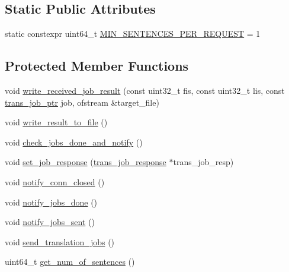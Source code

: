 \subsection*{Static Public Attributes}
\begin{DoxyCompactItemize}
\item 
static constexpr uint64\+\_\+t \hyperlink{classuva_1_1smt_1_1bpbd_1_1client_1_1trans__manager_a805717fdbf4e89f34206499160d8155b}{M\+I\+N\+\_\+\+S\+E\+N\+T\+E\+N\+C\+E\+S\+\_\+\+P\+E\+R\+\_\+\+R\+E\+Q\+U\+E\+S\+T} = 1
\end{DoxyCompactItemize}
\subsection*{Protected Member Functions}
\begin{DoxyCompactItemize}
\item 
void \hyperlink{classuva_1_1smt_1_1bpbd_1_1client_1_1trans__manager_a89447f8d607a208280bab7d175ee31f4}{write\+\_\+received\+\_\+job\+\_\+result} (const uint32\+\_\+t fis, const uint32\+\_\+t lis, const \hyperlink{namespaceuva_1_1smt_1_1bpbd_1_1client_a9de0122a1e3e5b28765f0b7b06449aa5}{trans\+\_\+job\+\_\+ptr} job, ofstream \&target\+\_\+file)
\item 
void \hyperlink{classuva_1_1smt_1_1bpbd_1_1client_1_1trans__manager_a78c14976fac089d29a423e597a4af98f}{write\+\_\+result\+\_\+to\+\_\+file} ()
\item 
void \hyperlink{classuva_1_1smt_1_1bpbd_1_1client_1_1trans__manager_ad36b90b1a5f36a6a4ae92460aa242f2a}{check\+\_\+jobs\+\_\+done\+\_\+and\+\_\+notify} ()
\item 
void \hyperlink{classuva_1_1smt_1_1bpbd_1_1client_1_1trans__manager_acd73d0878dc3727ea3af05a58ff0eeb9}{set\+\_\+job\+\_\+response} (\hyperlink{classuva_1_1smt_1_1bpbd_1_1common_1_1messaging_1_1trans__job__response}{trans\+\_\+job\+\_\+response} $\ast$trans\+\_\+job\+\_\+resp)
\item 
void \hyperlink{classuva_1_1smt_1_1bpbd_1_1client_1_1trans__manager_ac69d151183cd28dae1ac0ca96664dda9}{notify\+\_\+conn\+\_\+closed} ()
\item 
void \hyperlink{classuva_1_1smt_1_1bpbd_1_1client_1_1trans__manager_a6c8d85fe4ba5cd8bcb5e067f9754b1be}{notify\+\_\+jobs\+\_\+done} ()
\item 
void \hyperlink{classuva_1_1smt_1_1bpbd_1_1client_1_1trans__manager_a7827236377e8690c42d96a0f8f2bb138}{notify\+\_\+jobs\+\_\+sent} ()
\item 
void \hyperlink{classuva_1_1smt_1_1bpbd_1_1client_1_1trans__manager_a3cf856ae3a65d513e7d8e0759b969517}{send\+\_\+translation\+\_\+jobs} ()
\item 
uint64\+\_\+t \hyperlink{classuva_1_1smt_1_1bpbd_1_1client_1_1trans__manager_af6f6b2fabe28846158ba8b53fc9d07d9}{get\+\_\+num\+\_\+of\+\_\+sentences} ()
\end{DoxyCompactItemize}


